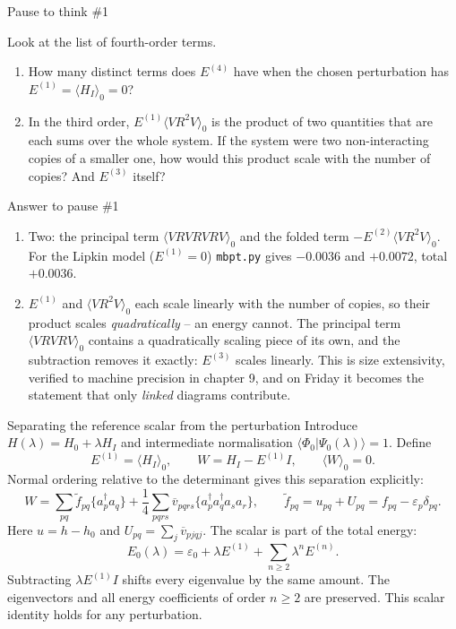 \documentclass[aspectratio=169,10pt]{beamer}
\newcounter{thinkctr}
\newcommand{\thinkq}[2]{%
  \stepcounter{thinkctr}%
  \vfill
  \begin{tcolorbox}[enhanced,colback=palewarm,colframe=warm,boxrule=1.2pt,arc=4pt,
    grow to left by=6mm,grow to right by=6mm,
    left=16pt,right=16pt,top=16pt,bottom=18pt,
    fonttitle=\bfseries\Large,fontupper=\Large,
    title={Pause to think \#\thethinkctr\hfill\mdseries\normalsize(about #1 min -- discuss with your neighbour)}]
  #2
  \end{tcolorbox}
  \vfill}
\newcommand{\thinka}[1]{%
  \vfill
  \begin{tcolorbox}[enhanced,colback=paleteal,colframe=teal,boxrule=1.2pt,arc=4pt,
    grow to left by=6mm,grow to right by=6mm,
    left=16pt,right=16pt,top=16pt,bottom=18pt,
    fonttitle=\bfseries\Large,fontupper=\large,
    title={Answer to pause \#\thethinkctr}]
  #1
  \end{tcolorbox}
  \vfill}
\newcommand{\braket}[2]{\langle #1\vert #2\rangle}
\newcommand{\av}[1]{\langle #1\rangle_0}
\newcommand{\cre}[1]{a_{#1}^{\dagger}}
\newcommand{\ann}[1]{a_{#1}}
\newcommand{\no}[1]{\bigl\{#1\bigr\}}
\newcommand{\vbar}[4]{\overline v_{#1#2#3#4}}
\newcommand{\ph}{\Phi_0}
\newcommand{\ftil}[1]{\tilde f_{#1}}
\begin{document}
\begin{frame}{Pause to think \#1}
\thinkq{3}{Look at the list of fourth-order terms.
\begin{enumerate}
\item How many distinct terms does \(E^{(4)}\) have when the chosen perturbation has \(E^{(1)}=\av{H_I}=0\)?
\item In the third order, \(E^{(1)}\av{VR^2V}\) is the product of two quantities that are each sums over the whole system. If the system were two non-interacting copies of a smaller one, how would this product scale with the number of copies? And \(E^{(3)}\) itself?
\end{enumerate}}
\end{frame}

\begin{frame}{Answer to pause \#1}
\thinka{%
\begin{enumerate}
\item Two: the principal term \(\av{VRVRVRV}\) and the folded term \(-E^{(2)}\av{VR^2V}\). For the Lipkin model (\(E^{(1)}=0\)) \texttt{mbpt.py} gives \(-0.0036\) and \(+0.0072\), total \(+0.0036\).
\item \(E^{(1)}\) and \(\av{VR^2V}\) each scale linearly with the number of copies, so their product scales \emph{quadratically} -- an energy cannot. The principal term \(\av{VRVRV}\) contains a quadratically scaling piece of its own, and the subtraction removes it exactly: \(E^{(3)}\) scales linearly. This is size extensivity, verified to machine precision in chapter 9, and on Friday it becomes the statement that only \emph{linked} diagrams contribute.
\end{enumerate}}
\end{frame}

\begin{frame}{Separating the reference scalar from the perturbation}
Introduce $H(\lambda)=H_0+\lambda H_I$ and intermediate normalisation $\braket{\ph}{\Psi_0(\lambda)}=1$. Define
\[
 E^{(1)}=\av{H_I},\qquad W=H_I-E^{(1)}I,\qquad \av{W}=0.
\]
Normal ordering relative to the determinant gives this separation explicitly:
\[
 W=\sum_{pq}\ftil{pq}\no{\cre{p}\ann{q}}
   +\frac14\sum_{pqrs}\vbar{p}{q}{r}{s}\no{\cre{p}\cre{q}\ann{s}\ann{r}},
 \qquad \ftil{pq}=u_{pq}+U_{pq}=f_{pq}-\varepsilon_p\delta_{pq}.
\]
Here $u=h-h_0$ and $U_{pq}=\sum_j\vbar{p}{j}{q}{j}$. The scalar is part of the total energy:
\[
 \boxed{E_0(\lambda)=\varepsilon_0+\lambda E^{(1)}+\sum_{n\ge2}\lambda^n E^{(n)}.}
\]
Subtracting $\lambda E^{(1)}I$ shifts every eigenvalue by the same amount. The eigenvectors and all energy coefficients of order $n\ge2$ are preserved. This scalar identity holds for any perturbation.
\end{frame}
\end{document}
